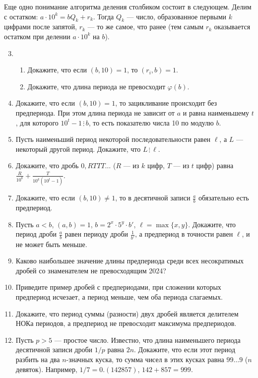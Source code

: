 \documentclass{article}
\begin{document}
    {Еще одно понимание алгоритма деления столбиком}  состоит в следующем.
    Делим с остатком: $a\cdot 10^k=bQ_k+r_k$.
    Тогда $Q_k$ --- число, образованное первыми $k$ цифрами после запятой,
    $r_k$ --- то же самое, что ранее (тем самым $r_k$ оказывается остатком при делении $a\cdot 10^k$ на $b$).
    \begin{enumerate}[label*=\protect\fbox{\arabic{enumi}}]
        \setcounter{enumi}{2}
        \item
        \begin{enumerate}
            \item Докажите, что если $(b,10)=1$, то $(r_i,b)=1$.
            \item Докажите, что длина периода не превосходит $\varphi(b)$.
        \end{enumerate}

        \item Докажите, что если $(b,10)=1$, то зацикливание происходит без предпериода.
        При этом длина периода не зависит от $a$ и равна наименьшему $t$, для которого $10^t-1 \,\vdots\, b$, то есть показателю числа 10 по модулю $b$.

        \item Пусть наименьший период некоторой последовательности равен $\ell$, а $L$ --- некоторый другой период.
        Докажите, что $L \,\vdots\, \ell$.

        \item Докажите, что дробь $0,RTTT\dots$ ($R$ --- из $k$ цифр, $T$ --- из $t$ цифр) равна $\frac{R}{10^k}+\frac{T}{10^k(10^t-1)}$.

        \item Докажите, что если $(b,10)\neq 1$, то в десятичной записи $\frac{a}{b}$ обязательно есть предпериод.

        \item Пусть $a<b$, $(a,b)=1$, $b=2^x\cdot 5^y\cdot b'$, $\ell=\max\{x,y\}$.
        Докажите, что период дроби $\frac{a}{b}$ равен периоду дроби $\frac{1}{b'}$, а предпериод в точности равен $\ell$, и не может быть меньше.

        \item Каково наибольшее значение длины предпериода среди всех несократимых дробей со знаменателем не превосходящим 2024?

        \item Приведите пример дробей с предпериодами, при сложении которых предпериод исчезает, а период меньше, чем оба периода слагаемых.

        \item Докажите, что период суммы (разности) двух дробей является делителем НОКа периодов, а предпериод не превосходит максимума предпериодов.

        \item Пусть $p>5$ --- простое число.
        Известно, что длина наименьшего периода десятичной записи дроби $1/p$ равна $2n$.
        Докажите, что если этот период разбить на два $n$-значных куска, то сумма чисел в этих кусках равна $99\dots 9$ ($n$ девяток).
        Например, $1/7=0.(142857)$, $142+857=999$.

    \end{enumerate}
\end{document}
